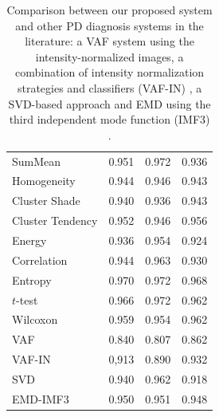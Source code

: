 \begin{table}[ht]
	\centering
	\begin{tabular}{lrrr}
		\toprule
		\tableheadline{System} & \tableheadline{Acc} & \tableheadline{Sens} & \tableheadline{Spec} \\ \midrule
		SumMean                &               0.951 &                0.972 &                0.936 \\
		Homogeneity            &               0.944 &                0.946 &                0.943 \\
		Cluster Shade          &               0.940 &                0.936 &                0.943 \\
		Cluster Tendency       &               0.952 &                0.946 &                0.956 \\
		Energy                 &               0.936 &                0.954 &                0.924 \\
		Correlation            &               0.944 &                0.963 &                0.930 \\ \midrule
		Entropy                &               0.970 &                0.972 &                0.968 \\
		$t$-test               &               0.966 &                0.972 &                0.962 \\
		Wilcoxon               &               0.959 &                0.954 &                0.962 \\ \midrule
		VAF                    &               0.840 &                0.807 &                0.862 \\
		VAF-IN                 &               0,913 &                0.890 &                0.932 \\
		SVD                    &               0.940 &                0.962 &                0.918 \\
		EMD-IMF3               &               0.950 &                0.951 &                0.948 \\ \bottomrule
	\end{tabular}
	\vspace{10pt}
	\caption[Comparison between our proposed system and other \ac{PD} diagnosis systems in the literature.]{Comparison between our proposed system and other \ac{PD} diagnosis systems in the literature: a VAF system using the intensity-normalized images,  a combination of intensity normalization strategies and classifiers (VAF-IN) \cite{Illan2012}, a SVD-based approach \cite{Segovia2012} and EMD using the third independent mode function (IMF3) \cite{Rojas2012}.}
	\label{tab:comparison}
\end{table}

